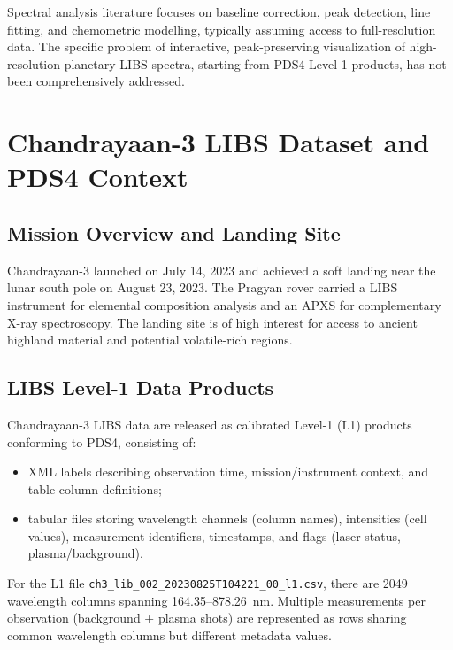 \documentclass[12pt,a4paper]{article}
\begin{document}
Spectral analysis literature focuses on baseline correction, peak detection, line fitting, and chemometric modelling, typically assuming access to full-resolution data.\cite{Cremers2006} The specific problem of interactive, peak-preserving visualization of high-resolution planetary LIBS spectra, starting from PDS4 Level-1 products, has not been comprehensively addressed.

\section{Chandrayaan-3 LIBS Dataset and PDS4 Context}
\label{sec:data}

\subsection{Mission Overview and Landing Site}

Chandrayaan-3 launched on July 14, 2023 and achieved a soft landing near the lunar south pole on August 23, 2023.\cite{ISROCh3web} The Pragyan rover carried a LIBS instrument for elemental composition analysis and an APXS for complementary X-ray spectroscopy.\cite{ISROCh3web} The landing site is of high interest for access to ancient highland material and potential volatile-rich regions.

\subsection{LIBS Level-1 Data Products}

Chandrayaan-3 LIBS data are released as calibrated Level-1 (L1) products conforming to PDS4, consisting of:

\begin{itemize}[nosep]
  \item XML labels describing observation time, mission/instrument context, and table column definitions;
  \item tabular files storing wavelength channels (column names), intensities (cell values), measurement identifiers, timestamps, and flags (laser status, plasma/background).
\end{itemize}

For the L1 file \texttt{ch3\_lib\_002\_20230825T104221\_00\_l1.csv}, there are 2049 wavelength columns spanning 164.35--878.26~nm. Multiple measurements per observation (background + plasma shots) are represented as rows sharing common wavelength columns but different metadata values.
\end{document}

